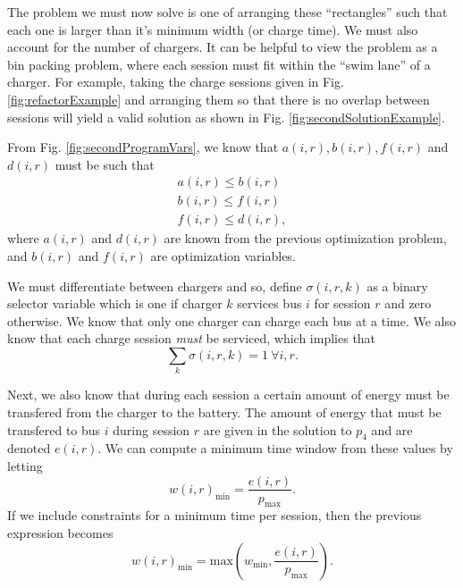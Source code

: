 \par The problem we must now solve is one of arranging these ``rectangles'' such that each one is larger than it's minimum width (or charge time).  We must also account for the number of chargers. It can be helpful to view the problem as a bin packing problem, where each session must fit within the ``swim lane'' of a charger.  For example, taking the charge sessions given in Fig. \ref{fig:refactorExample} and arranging them so that there is no overlap between sessions will yield a valid solution as shown in Fig. \ref{fig:secondSolutionExample}.
\par From Fig. \ref{fig:secondProgramVars}, we know that $a(i,r), b(i,r),f(i,r)$ and $d(i,r)$ must be such that 
\begin{equation}\label{eqn:assignment:eqn1}\begin{aligned}
	a(i,r) \le b(i,r) \\
	b(i,r) \le f(i,r) \\
	f(i,r) \le d(i,r), 	
\end{aligned}\end{equation}
where $a(i,r)$ and $d(i,r)$ are known from the previous optimization problem, and $b(i,r)$ and $f(i,r)$ are optimization variables. 
\par We must differentiate between chargers and so, define $\sigma(i,r,k)$ as a binary selector variable which is one if charger $k$ services bus $i$ for session $r$ and zero otherwise. We know that only one charger can charge each bus at a time. We also know that each charge session {\it must} be serviced, which implies that
\begin{equation}\label{eqn:assignment:eqn2}
	\sum_k \sigma(i,r,k) = 1  \ \forall i,r.
\end{equation}
\par Next, we also know that during each session a certain amount of energy must be transfered from the charger to the battery.  The amount of energy that must be transfered to bus $i$ during session $r$ are given in the solution to $p_4$ and are denoted $e(i,r)$. We can compute a minimum time window from these values by letting 
\begin{equation}\label{eqn:assignment:eqn3}
	w(i,r)_{\text{min}} = \frac{e(i,r)}{p_\text{max}}.
\end{equation}
If we include constraints for a minimum time per session, then the previous expression becomes
\begin{equation*}
	w(i,r)_{\text{min}} = \text{max}\left ( w_{\text{min}}, \frac{e(i,r)}{p_\text{max}} \right ).
\end{equation*}
